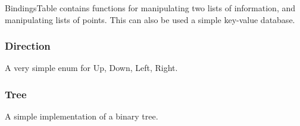 Bindings\+Table contains functions for manipulating two lists of information, and manipulating lists of points. This can also be used a simple key-\/value database.

\subsubsection*{Direction}

A very simple enum for Up, Down, Left, Right.

\subsubsection*{Tree}

A simple implementation of a binary tree. 